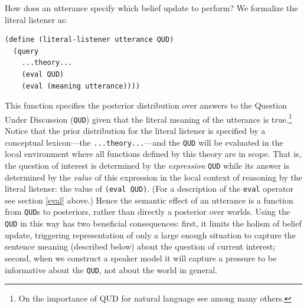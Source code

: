 \documentclass[pdfextras]{handbook}
\begin{document}
How does an utterance specify which belief update to perform? We formalize the literal listener as:
\begin{lstlisting}
(define (literal-listener utterance QUD)
  (query
    ...theory...
    (eval QUD)
    (eval (meaning utterance))))
\end{lstlisting}
This function specifies the posterior distribution over answers to the Question Under Discussion (\lstinline{QUD}) given that the literal meaning of the utterance is true.\footnote{On the importance of QUD for natural language see \citealt{ginzburg95a,van1995discourse,roberts96,beaverclark08} among many others.} 
Notice that the prior distribution for the literal listener is specified by a conceptual lexicon---the \lstinline{...theory...}---and the \lstinline{QUD} will be evaluated in the local environment where all functions defined by this theory are in scope. That is, the question of interest is determined by the \emph{expression} \lstinline{QUD} while its answer is determined by the \emph{value} of this expression in the local context of reasoning by the literal listener: the value of \lstinline{(eval QUD)}. (For a description of the \lstinline{eval} operator see section \ref{eval} above.)
Hence the semantic effect of an utterance is a function from \lstinline{QUD}s to posteriors, rather than directly a posterior over worlds. Using the \lstinline{QUD} in this way has two beneficial consequences: first, it limits the holism of belief update, triggering representation of only a large enough situation to capture the sentence meaning (described below) about the question of current interest; second, when we construct a speaker model it will capture a pressure to be informative about the \lstinline{QUD}, not about the world in general.
\end{document}
